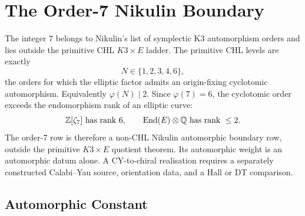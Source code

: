 \providecommand{\Z}{\mathbb{Z}}
\providecommand{\Q}{\mathbb{Q}}
\providecommand{\R}{\mathbb{R}}
\providecommand{\C}{\mathbb{C}}
\providecommand{\CC}{\mathbb{C}}
\providecommand{\HH}{\mathbb{H}}
\providecommand{\muFour}{\mu_{4}}
\providecommand{\cG}{\mathcal{G}}
\providecommand{\cO}{\mathcal{O}}
\providecommand{\cH}{\widehat{H}}
\providecommand{\Aut}{\mathrm{Aut}}
\providecommand{\Auts}{\mathrm{Aut}_{s}}
\providecommand{\Fix}{\mathrm{Fix}}
\providecommand{\End}{\mathrm{End}}
\providecommand{\Hilb}{\mathrm{Hilb}}
\providecommand{\BPS}{\mathrm{BPS}}
\providecommand{\DT}{\mathrm{DT}}
\providecommand{\red}{\mathrm{red}}
\providecommand{\wt}{\mathrm{wt}}
\providecommand{\kBKM}{\kappa_{\mathrm{BKM}}}
\providecommand{\kBKMaut}{\kappa_{\mathrm{BKM}}^{\mathrm{aut}}}
\providecommand{\kch}{\kappa_{\mathrm{ch}}}
\providecommand{\kcat}{\kappa_{\mathrm{cat}}}
\providecommand{\kfib}{\kappa_{\mathrm{fiber}}}
\providecommand{\PhiNik}{\Phi_{7}^{\mathrm{Nik}}}
\providecommand{\Dfive}{\Delta_{5}}
\providecommand{\PhiTenUn}{\Phi_{10}^{\mathrm{un}}}
\providecommand{\PhiTenOP}{\Phi_{10}^{\mathrm{OP}}}

\section*{The Order-7 Nikulin Boundary}
\label{wn:sec:N7-nikulin-boundary}

The integer \(7\) belongs to Nikulin's list of symplectic K3
automorphism orders and lies outside the primitive CHL
\(K3\times E\) ladder.  The primitive CHL levels are exactly
\[
  N\in\{1,2,3,4,6\},
\]
the orders for which the elliptic factor admits an origin-fixing
cyclotomic automorphism.  Equivalently
\(\varphi(N)\mid2\).  Since \(\varphi(7)=6\), the cyclotomic order
exceeds the endomorphism rank of an elliptic curve:
\[
  \Z[\zeta_7]\ \hbox{has rank }6,\qquad \End(E)\otimes\Q
  \hbox{ has rank }\leq 2 .
\]
The order-7 row is therefore a non-CHL Nikulin automorphic boundary
row, outside the primitive \(K3\times E\) quotient theorem.
Its automorphic weight is an automorphic datum alone.  A CY-to-chiral
realisation requires a separately constructed Calabi--Yau source,
orientation data, and a Hall or DT comparison.

\subsection*{Automorphic Constant}

